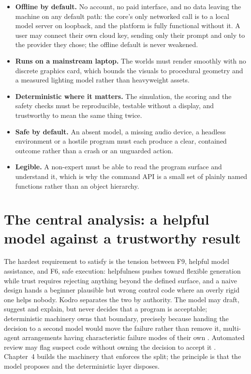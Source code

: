 \documentclass[11pt,a4paper]{report}
\begin{document}
\begin{itemize}
\item {} \textbf{Offline by default.} No account, no paid interface, and no data leaving the machine on any default path: the core's only networked call is to a local model server on loopback, and the platform is fully functional without it. A user may connect their own cloud key, sending only their prompt and only to the provider they chose; the offline default is never weakened.
\item {} \textbf{Runs on a mainstream laptop.} The worlds must render smoothly with no discrete graphics card, which bounds the visuals to procedural geometry and a measured lighting model rather than heavyweight assets.
\item \textbf{Deterministic where it matters.} The simulation, the scoring and the safety checks must be reproducible, testable without a display, and trustworthy to mean the same thing twice.
\item {} \textbf{Safe by default.} An absent model, a missing audio device, a headless environment or a hostile program must each produce a clear, contained outcome rather than a crash or an unguarded action.
\item {} \textbf{Legible.} A non-expert must be able to read the program surface and understand it, which is why the command API is a small set of plainly named functions rather than an object hierarchy.
\end{itemize}

\section{The central analysis: a helpful model against a trustworthy result}
 The hardest requirement to satisfy is the tension between F9, helpful model assistance, and F6, safe execution: helpfulness pushes toward flexible generation while trust requires rejecting anything beyond the defined surface, and a naive design hands a beginner plausible but wrong control code where an overly rigid one helps nobody. Kodro separates the two by authority. The model may draft, suggest and explain, but never decides that a program is acceptable; deterministic machinery owns that boundary, precisely because handing the decision to a second model would move the failure rather than remove it, multi-agent arrangements having characteristic failure modes of their own \citep{cemri2025}. Automated review may flag suspect code without owning the decision to accept it \citep{sun2025}. Chapter~4 builds the machinery that enforces the split; the principle is that the model proposes and the deterministic layer disposes.
\end{document}
